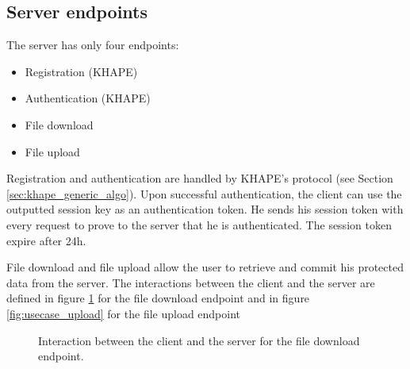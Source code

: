 \documentclass[../report.tex]{subfiles}
\begin{document}
\subsection{Server endpoints}
The server has only four endpoints:

\begin{itemize}
 \item Registration (KHAPE)
 \item Authentication (KHAPE)
 \item File download
 \item File upload
\end{itemize}

Registration and authentication are handled by KHAPE's protocol (see Section \ref{sec:khape_generic_algo}). Upon successful authentication, the client can use the outputted session key as an authentication token. He sends his session token with every request to prove to the server that he is authenticated. The session token expire after 24h.

File download and file upload allow the user to retrieve and commit his protected data from the server. The interactions between the client and the server are defined in figure \ref{fig:usecase_download} for the file download endpoint and in figure \ref{fig:usecase_upload} for the file upload endpoint




\begin{figure}[h]
 \centering

 \setlength{\fboxsep}{10pt}
 \setlength{\fboxrule}{1pt}

 \caption{Interaction between the client and the server for the file download endpoint.}
 \label{fig:usecase_download}
\end{figure}
\end{document}
